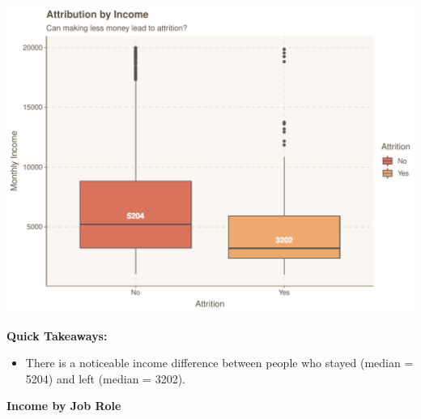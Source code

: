 \documentclass[
]{article}
\providecommand{\tightlist}{%
  \setlength{\itemsep}{0pt}\setlength{\parskip}{0pt}}
\begin{document}
\includegraphics{figures/unnamed-chunk-12-1.pdf}

\textbf{Quick Takeaways:}

\begin{itemize}
\tightlist
\item
  There is a noticeable income difference between people who stayed
  (median = 5204) and left (median = 3202).
\end{itemize}

\textbf{Income by Job Role}
\end{document}
